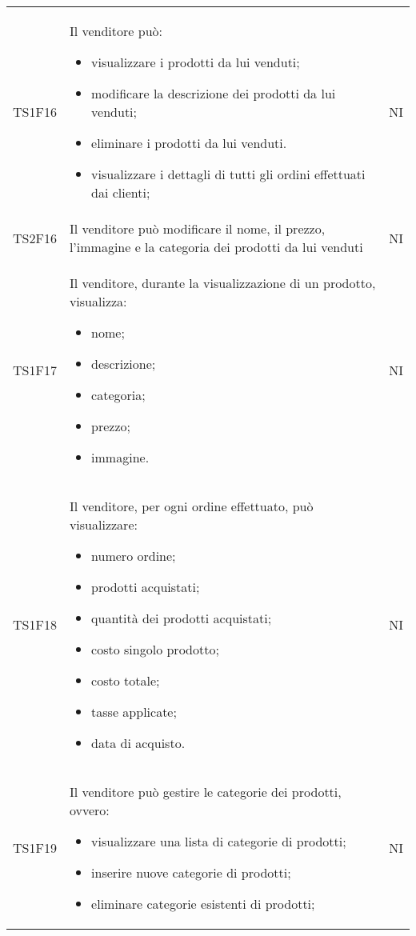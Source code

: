 {\begin{longtable}{C{3cm} C{10.2cm} C{1.5cm}}
TS1F16 & Il venditore può:
\begin{itemize}
	\item visualizzare i prodotti da lui venduti;
	\item modificare la descrizione dei prodotti da lui venduti;
	\item eliminare i prodotti da lui venduti.
	\item visualizzare i dettagli di tutti gli ordini effettuati dai clienti;
\end{itemize} & NI\\

TS2F16 & Il venditore può modificare il nome, il prezzo, l'immagine e la categoria dei prodotti da lui venduti & NI\\

TS1F17 & Il venditore, durante la visualizzazione di un prodotto, visualizza:
\begin{itemize}
	\item nome;
	\item descrizione;
	\item categoria;
	\item prezzo;
	\item immagine.
\end{itemize} & NI\\

TS1F18 & Il venditore, per ogni ordine effettuato, può visualizzare:
\begin{itemize}
	\item numero ordine;
	\item prodotti acquistati;
	\item quantità dei prodotti acquistati;
	\item costo singolo prodotto;
	\item costo totale;
	\item tasse applicate;
	\item data di acquisto.
\end{itemize}
& NI\\

TS1F19 & Il venditore può gestire le categorie dei prodotti, ovvero:
\begin{itemize}
	\item visualizzare una lista di categorie di prodotti;
	\item inserire nuove categorie di prodotti;
	\item eliminare categorie esistenti di prodotti;
\end{itemize}
& NI\\






\end{longtable}}
